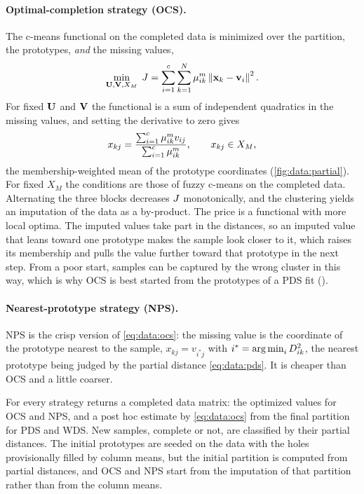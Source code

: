 \paragraph{Optimal-completion strategy (OCS).} The c-means functional on the completed data is minimized over the partition, the prototypes, \emph{and} the missing values,
\begin{equation}
  \min_{\mathbf{U},\mathbf{V},X_M}\;J=\sum_{i=1}^{c}\sum_{k=1}^{N}\mu_{ik}^m\left\lVert \mathbf{x}_k-\mathbf{v}_i \right\rVert^2 .
  \label{eq:data:ocsJ}
\end{equation}
For fixed $\mathbf{U}$ and $\mathbf{V}$ the functional is a sum of independent quadratics in the missing values, and setting the derivative to zero gives
\begin{equation}
  x_{kj}=\frac{\sum_{i=1}^{c}\mu_{ik}^m v_{ij}}{\sum_{i=1}^{c}\mu_{ik}^m},\qquad x_{kj}\in X_M ,
  \label{eq:data:ocs}
\end{equation}
the membership-weighted mean of the prototype coordinates (\cref{fig:data:partial}). For fixed $X_M$ the conditions are those of fuzzy c-means on the completed data. Alternating the three blocks decreases $J$ monotonically, and the clustering yields an imputation of the data as a by-product. The price is a functional with more local optima. The imputed values take part in the distances, so an imputed value that leans toward one prototype makes the sample look closer to it, which raises its membership and pulls the value further toward that prototype in the next step. From a poor start, samples can be captured by the wrong cluster in this way, which is why OCS is best started from the prototypes of a PDS fit ().

\paragraph{Nearest-prototype strategy (NPS).} NPS is the crisp version of \eqref{eq:data:ocs}: the missing value is the coordinate of the prototype nearest to the sample, $x_{kj}=v_{i^*j}$ with $i^*=\operatorname{arg\,min}_iD^2_{ik}$, the nearest prototype being judged by the partial distance \eqref{eq:data:pds}. It is cheaper than OCS and a little coarser.

For every strategy  returns a completed data matrix: the optimized values for OCS and NPS, and a post hoc estimate by \eqref{eq:data:ocs} from the final partition for PDS and WDS. New samples, complete or not, are classified by their partial distances. The initial prototypes are seeded on the data with the holes provisionally filled by column means, but the initial partition is computed from partial distances, and OCS and NPS start from the imputation of that partition rather than from the column means.

